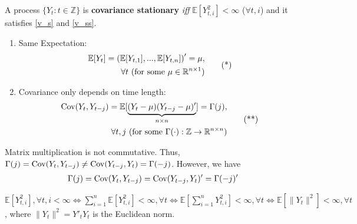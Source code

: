 \documentclass[11pt]{elegantbook}
\begin{document}
\begin{definition}
    A process $\{Y_t:t\in \mathbb{Z}\}$ is \textbf{covariance stationary} \textit{iff} $\mathbb{E}[Y_{t,i}^2]<\infty$ ($\forall t,i$) and it satisfies \eqref{v_s} and \eqref{v_ss}.
    \begin{enumerate}
        \item Same Expectation:
        \begin{equation}
            \begin{aligned}
                \mathbb{E}[Y_t]=\left(\mathbb{E}[Y_{t,1}],...,\mathbb{E}[Y_{t,n}]\right)'=\mu,\\ \forall t \textnormal{ (for some $\mu\in \mathbb{R}^{n\times 1}$)}
            \end{aligned}
            \label{v_s}
            \tag{*}
        \end{equation}
        \item Covariance only depends on time length:
        \begin{equation}
            \begin{aligned}
                \textnormal{Cov}(Y_t,Y_{t-j})=\mathbb{E}[\underbrace{(Y_t-\mu)(Y_{t-j}-\mu)'}_{n\times n}]=\Gamma(j),\\ \forall t,j \textnormal{ (for some $\Gamma(\cdot): \mathbb{Z} \rightarrow \mathbb{R}^{n\times n}$)}
            \end{aligned}
            \label{v_ss}
            \tag{**}
        \end{equation}
    \end{enumerate}
\end{definition}
\begin{note}
    Matrix multiplication is not commutative. Thus, $\Gamma(j)=\textnormal{Cov}(Y_t,Y_{t-j})\neq \textnormal{Cov}(Y_{t-j},Y_t)=\Gamma(-j)$. However, we have
    \begin{equation}
        \begin{aligned}
            \Gamma(j)=\textnormal{Cov}(Y_t,Y_{t-j})=\textnormal{Cov}(Y_{t-j},Y_t)'=\Gamma(-j)'
        \end{aligned}
        \nonumber
    \end{equation}
\end{note}
\begin{note}
    $\mathbb{E}[Y_{t,i}^2],\forall t,i<\infty \Leftrightarrow \sum_{i=1}^n \mathbb{E}[Y_{t,i}^2]<\infty,\forall t \Leftrightarrow \mathbb{E}[\sum_{i=1}^n Y_{t,i}^2]<\infty,\forall t\Leftrightarrow \mathbb{E}\left[\|Y_t\|^2\right]<\infty,\forall t$, where $\|Y_t\|^2=Y'_tY_t$ is the Euclidean norm.
\end{note}
\end{document}
